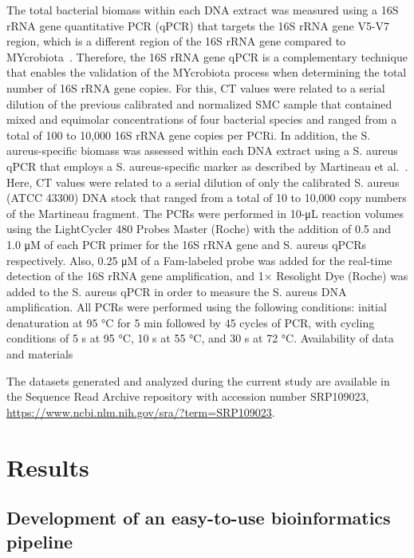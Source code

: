 The total bacterial biomass within each DNA extract was measured using a 16S rRNA gene quantitative PCR (qPCR) that targets the 16S rRNA gene V5-V7 region, which is a different region of the 16S rRNA gene compared to MYcrobiota~\cite{yang2002quantitative}. Therefore, the 16S rRNA gene qPCR is a complementary technique that enables the validation of the MYcrobiota process when determining the total number of 16S rRNA gene copies. For this, CT values were related to a serial dilution of the previous calibrated and normalized SMC sample that contained mixed and equimolar concentrations of four bacterial species and ranged from a total of 100 to 10,000 16S rRNA gene copies per PCRi\@. In addition, the S. aureus-specific biomass was assessed within each DNA extract using a S. aureus qPCR that employs a S. aureus-specific marker as described by Martineau et al.~\cite{martineau1998species}. Here, CT values were related to a serial dilution of only the calibrated S. aureus (ATCC 43300) DNA stock that ranged from a total of 10 to 10,000 copy numbers of the Martineau fragment. The PCRs were performed in 10-μL reaction volumes using the LightCycler 480 Probes Master (Roche) with the addition of 0.5 and 1.0 μM of each PCR primer for the 16S rRNA gene and S. aureus qPCRs respectively. Also, 0.25 μM of a Fam-labeled probe was added for the real-time detection of the 16S rRNA gene amplification, and 1× Resolight Dye (Roche) was added to the S. aureus qPCR in order to measure the S. aureus DNA amplification. All PCRs were performed using the following conditions: initial denaturation at 95 °C for 5 min followed by 45 cycles of PCR, with cycling conditions of 5 s at 95 °C, 10 s at 55 °C, and 30 s at 72 °C.
Availability of data and materials

The datasets generated and analyzed during the current study are available in the Sequence Read Archive repository with accession number SRP109023, \url{https://www.ncbi.nlm.nih.gov/sra/?term=SRP109023}.


\section*{Results}

\subsection*{Development of an easy-to-use bioinformatics pipeline}

